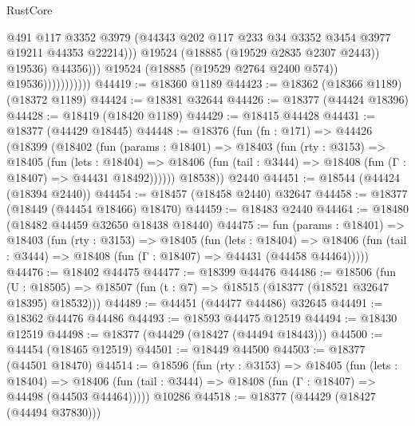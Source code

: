 \begin{lexlean}{RustCore}
\begin{coremodule}
                                      @491
                                      @117
                                      @3352
                                      @3979
                                      (@44343
                                        @202
                                        @117
                                        @233
                                        @34
                                        @3352
                                        @3454
                                        @3977
                                        @19211
                                        @44353
                                        @22214)))
                                  @19524
                                  (@18885 (@19529 @2835 @2307 @2443))
                                  @19536)
                                @44356)))
                          @19524
                          (@18885 (@19529 @2764 @2400 @574))
                          @19536)))))))))))
@44419 := @18360 @1189
@44423 := @18362 (@18366 @1189) (@18372 @1189)
@44424 := @18381 @32644
@44426 := @18377 (@44424 @18396)
@44428 := @18419 (@18420 @1189)
@44429 := @18415 @44428
@44431 := @18377 (@44429 @18445)
@44448 := @18376
    (fun (fn : @171) =>
    @44426
      (@18399
        (@18402
          (fun (params : @18401) =>
          @18403
            (fun (rty : @3153) =>
            @18405
              (fun (lets : @18404) =>
              @18406 (fun (tail : @3444) => @18408 (fun (Γ : @18407) => @44431 @18492))))))
        @18538))
    @2440
@44451 := @18544 (@44424 (@18394 @2440))
@44454 := @18457 (@18458 @2440) @32647
@44458 := @18377 (@18449 (@44454 @18466) @18470)
@44459 := @18483 @2440
@44464 := @18480 (@18482 @44459 @32650 @18438 @18440)
@44475 := fun (params : @18401) =>
  @18403
    (fun (rty : @3153) =>
    @18405
      (fun (lets : @18404) =>
      @18406 (fun (tail : @3444) => @18408 (fun (Γ : @18407) => @44431 (@44458 @44464)))))
@44476 := @18402 @44475
@44477 := @18399 @44476
@44486 := @18506
    (fun (U : @18505) => @18507 (fun (t : @7) => @18515 (@18377 (@18521 @32647 @18395) @18532)))
@44489 := @44451 (@44477 @44486) @32645
@44491 := @18362 @44476 @44486
@44493 := @18593 @44475 @12519
@44494 := @18430 @12519
@44498 := @18377 (@44429 (@18427 (@44494 @18443)))
@44500 := @44454 (@18465 @12519)
@44501 := @18449 @44500
@44503 := @18377 (@44501 @18470)
@44514 := @18596
    (fun (rty : @3153) =>
    @18405
      (fun (lets : @18404) =>
      @18406 (fun (tail : @3444) => @18408 (fun (Γ : @18407) => @44498 (@44503 @44464)))))
    @10286
@44518 := @18377 (@44429 (@18427 (@44494 @37830)))

\end{coremodule}
\end{lexlean}
